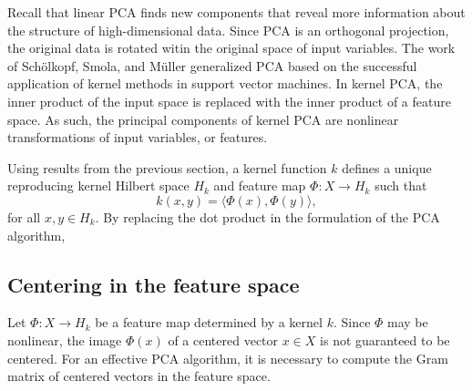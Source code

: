 Recall that linear PCA finds new components that reveal more information about the structure of high-dimensional data.
Since PCA is an orthogonal projection, the original data is rotated witin the original space of input variables.
The work of Sch\"olkopf, Smola, and M\"uller \cite{scholkopf1997kernel,scholkopf1998nonlinear} generalized PCA based on the successful application of kernel methods in support vector machines.
In kernel PCA, the inner product of the input space is replaced with the inner product of a feature space.
As such, the principal components of kernel PCA are nonlinear transformations of input variables, or features.

Using results from the previous section, a kernel function \(k\) defines a unique reproducing kernel Hilbert space \(H_k\) and feature map \(\Phi : X \to H_k\) such that
\begin{equation}
    \label{eqn:kernel-inner-product}
    k(x,y) = \langle \Phi(x), \Phi(y) \rangle,
\end{equation}
for all \(x, y \in H_k\).
By replacing the dot product in the formulation of the PCA algorithm, 

\subsection{Centering in the feature space}
Let \(\Phi : X \to H_k\) be a feature map determined by a kernel \(k\).
Since \(\Phi\) may be nonlinear, the image \(\Phi(x)\) of a centered vector \(x \in X\) is not guaranteed to be centered.
For an effective PCA algorithm, it is necessary to compute the Gram matrix of centered vectors in the feature space. \cite{scholkopf1998nonlinear}

